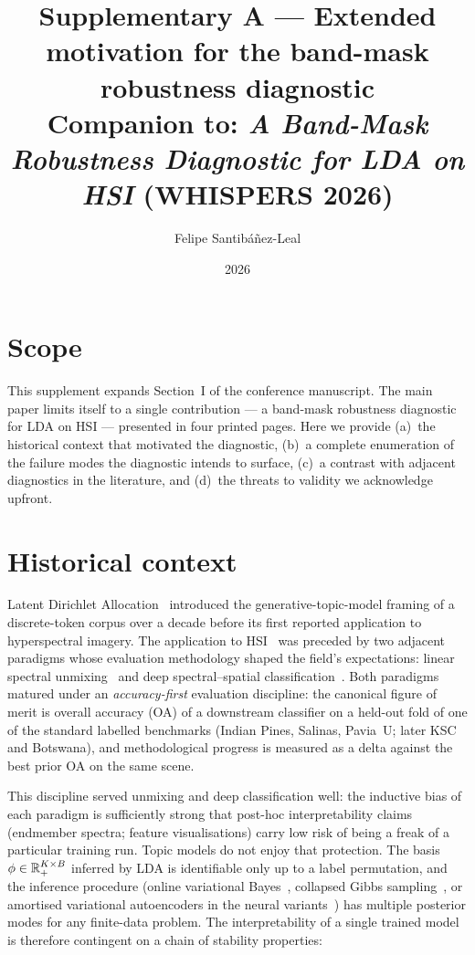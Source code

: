 \documentclass[11pt,a4paper]{article}
\title{Supplementary A --- Extended motivation for the band-mask
robustness diagnostic\\
{\large Companion to: \emph{A Band-Mask Robustness Diagnostic for LDA on HSI}
(WHISPERS 2026)}}
\author{Felipe Santib\'a\~nez-Leal}
\date{2026}
\begin{document}
\maketitle

\section{Scope}
This supplement expands Section~I of the conference manuscript. The
main paper limits itself to a single contribution --- a band-mask
robustness diagnostic for LDA on HSI --- presented in four printed
pages. Here we provide (a)~the historical context that motivated the
diagnostic, (b)~a complete enumeration of the failure modes the
diagnostic intends to surface, (c)~a contrast with adjacent
diagnostics in the literature, and (d)~the threats to validity we
acknowledge upfront.

\section{Historical context}

Latent Dirichlet Allocation~\cite{blei2003lda} introduced the
generative-topic-model framing of a discrete-token corpus over a
decade before its first reported application to hyperspectral
imagery. The application to HSI~\cite{zou2017pmlda,liu2019hsilda} was
preceded by two adjacent paradigms whose evaluation methodology
shaped the field's expectations:
linear spectral unmixing~\cite{nascimento2005vca,bioucasdias2012unmixing}
and deep spectral--spatial
classification~\cite{chen2014deep,paoletti2019deep}. Both paradigms
matured under an \emph{accuracy-first} evaluation discipline: the
canonical figure of merit is overall accuracy (OA) of a downstream
classifier on a held-out fold of one of the standard labelled
benchmarks (Indian Pines, Salinas, Pavia~U; later KSC and Botswana),
and methodological progress is measured as a delta against the best
prior OA on the same scene.

This discipline served unmixing and deep classification well: the
inductive bias of each paradigm is sufficiently strong that
post-hoc interpretability claims (endmember spectra; feature
visualisations) carry low risk of being a freak of a particular
training run. Topic models do not enjoy that protection. The basis
$\phi \in \mathbb{R}_+^{K \times B}$ inferred by LDA is identifiable only up
to a label permutation, and the inference procedure (online
variational Bayes~\cite{hoffman2010online}, collapsed Gibbs
sampling~\cite{griffiths2004finding}, or amortised variational
autoencoders in the neural variants~\cite{srivastava2017autoencoding,
dieng2020topic}) has multiple posterior modes for any finite-data
problem. The interpretability of a single trained model is therefore
contingent on a chain of stability properties:
\end{document}
